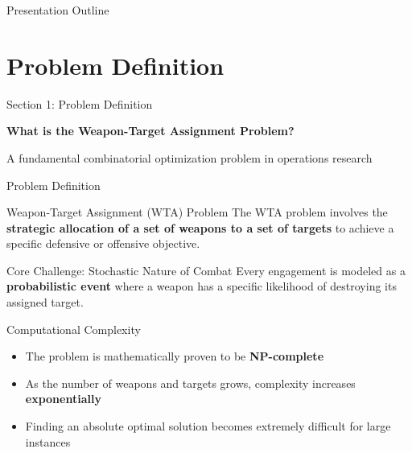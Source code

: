 \documentclass[aspectratio=43,8pt]{beamer}
\begin{document}
\begin{frame}{Presentation Outline}
\end{frame}

\section{Problem Definition}

\begin{frame}{Section 1: Problem Definition}
\begin{center}
{\Large\textcolor{primaryblue}{\textbf{What is the Weapon-Target Assignment Problem?}}}

\vspace{0.5cm}
{\normalsize A fundamental combinatorial optimization problem in operations research}
\end{center}
\end{frame}

\begin{frame}{Problem Definition}
\begin{block}{Weapon-Target Assignment (WTA) Problem}
The WTA problem involves the \textbf{strategic allocation of a set of weapons to a set of targets} to achieve a specific defensive or offensive objective.
\end{block}

\vspace{0.3cm}
\begin{alertblock}{Core Challenge: Stochastic Nature of Combat}
Every engagement is modeled as a \textbf{probabilistic event} where a weapon has a specific likelihood of destroying its assigned target.
\end{alertblock}

\vspace{0.3cm}
\begin{exampleblock}{Computational Complexity}
\begin{itemize}
    \item The problem is mathematically proven to be \textbf{NP-complete}
    \item As the number of weapons and targets grows, complexity increases \textbf{exponentially}
    \item Finding an absolute optimal solution becomes extremely difficult for large instances
\end{itemize}
\end{exampleblock}
\end{frame}
\end{document}
